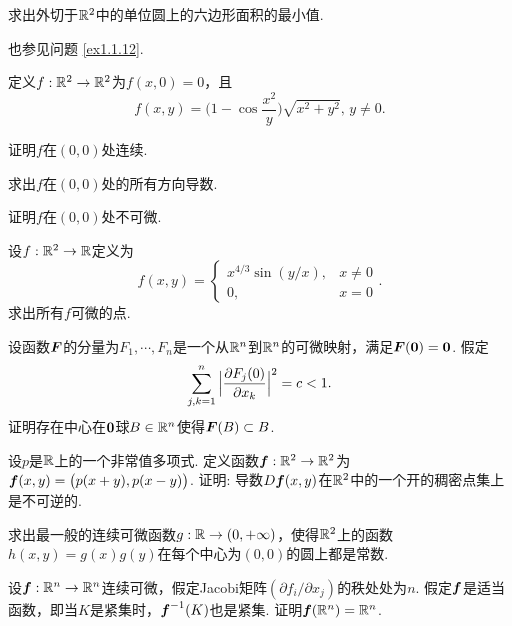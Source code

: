 \documentclass[openany,usenames,dvipsnames]{ctexbook}
\begin{document}
\begin{example}
  求出外切于$\mathbb R^2$中的单位圆上的六边形面积的最小值.
\end{example}
\begin{note}
    也参见问题 \ref{ex1.1.12}.
\end{note}

\begin{example}
  定义$f:\mathbb R^2\to\mathbb R^2$为$f(x,0)=0$，且
  \[
    f(x,y)=\Big( 1-\cos\frac{x^2}y \Big)\sqrt{x^2+y^2},\,y\ne0.
  \]
  \begin{eenum}
    \item 证明$f$在$(0,0)$处连续.
    \item 求出$f$在$(0,0)$处的所有方向导数.
    \item 证明$f$在$(0,0)$处不可微.
  \end{eenum}
\end{example}

\begin{example}
  设$f:\mathbb R^2\to\mathbb R$定义为
  \[
    f(x,y)= \begin{cases}
      x^{4/3}\sin(y/x), & x\ne0\\
      0, & x=0
    \end{cases}.
  \]
  求出所有$f$可微的点.
\end{example}

\begin{example}
  设函数$\boldsymbol F$的分量为$F_1,\cdots,F_n$是一个从$\mathbb R^n$到$\mathbb R^n$的可微映射，满足$\boldsymbol F(\boldsymbol 0)=\boldsymbol 0$. 假定
  \[
    \sum_{j,k=1}^n\Big| \frac{\partial F_j(0)}{\partial x_k} \Big|^2 = c<1.
  \]
  证明存在中心在$\boldsymbol 0$球$B\in\mathbb R^n$使得$\boldsymbol F(B)\subset B$.
\end{example}

\begin{example}
  设$p$是$\mathbb R$上的一个非常值多项式. 定义函数$\boldsymbol f:\mathbb R^2\to\mathbb R^2$为$\boldsymbol f(x,y)=\big(p(x+y),p(x-y)\big)$. 证明: 导数$D\boldsymbol f(x,y)$在$\mathbb R^2$中的一个开的稠密点集上是不可逆的.
\end{example}

\begin{example}
  求出最一般的连续可微函数$g:\mathbb R\to(0,+\infty)$，使得$\mathbb R^2$上的函数$h(x,y)=g(x)g(y)$在每个中心为$(0,0)$的圆上都是常数.
\end{example}

\begin{example}
  设$\boldsymbol f:\mathbb R^n\to\mathbb R^n$连续可微，假定Jacobi矩阵$(\partial f_i/\partial x_j)$的秩处处为$n$. 假定$\boldsymbol f$是适当函数，即当$K$是紧集时，$\boldsymbol f^{-1}(K)$也是紧集. 证明$\boldsymbol f(\mathbb R^n)=\mathbb R^n$.
\end{example}
\end{document}
